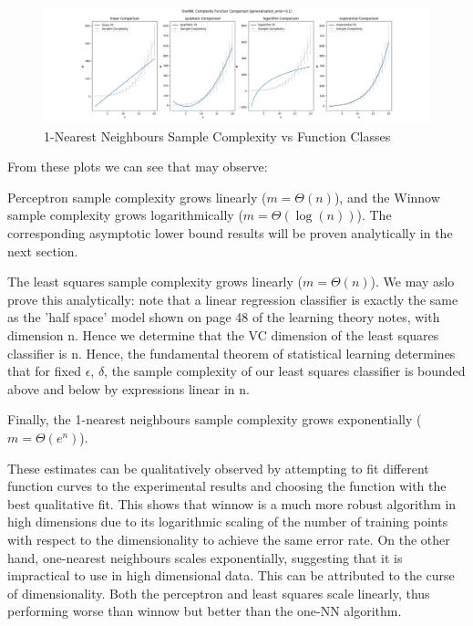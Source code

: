 \documentclass[12pt]{article}
\begin{document}
\begin{itemize}
    \begin{figure}[h]
    \centering
    \includegraphics[scale=0.35]{outputs/part3/q1a_one_nn_complexity_function_comparison.png}
    \caption{1-Nearest Neighbours Sample Complexity vs Function Classes}
    \label{fig:22}
    \end{figure}

    From these plots we can see that may observe:
    
    Perceptron sample complexity grows linearly ($m = \Theta(n)$), and the Winnow sample complexity grows logarithmically ($m = \Theta(\log(n))$). The corresponding asymptotic lower bound results will be proven analytically in the next section.

    The least squares sample complexity grows linearly ($m = \Theta(n)$). We may aslo prove this analytically: note that a linear regression classifier is exactly the same as the 'half space' model shown on page 48 of the learning theory notes,
     with dimension n. Hence we determine that the VC dimension of the least squares classifier is n. Hence, the fundamental theorem of statistical learning determines that for fixed
     $\epsilon$, $\delta$, the sample complexity of our least squares classifier is bounded above and below by expressions linear in n. 

    Finally, the 1-nearest neighbours sample complexity grows exponentially ($m = \Theta(e^{n})$).

    These estimates can be qualitatively observed by attempting to fit different function curves to the experimental
    results and choosing the function with the best qualitative fit. This shows that winnow is a much more robust 
    algorithm in high dimensions due to its logarithmic scaling of the number of training points with respect to
        the dimensionality to achieve the same error rate. On the other hand, one-nearest neighbours scales exponentially,
        suggesting that it is impractical to use in high dimensional data. This can be attributed to the curse of dimensionality.
        Both the perceptron and least squares scale linearly, thus performing worse than winnow but better than the one-NN algorithm.



\end{itemize}
\end{document}
